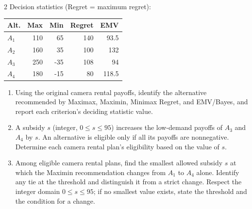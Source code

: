 \begin{multicols}{2}
\columnbreak
Decision statistics (Regret = maximum regret):

\vspace{-3mm}
\begin{center}\small\setlength{\tabcolsep}{4pt}
	\begin{tabular}{lrrrr}\toprule
		Alt. & Max & Min & Regret & EMV\\ \midrule
				$A_1$ & 110 & 65 & 140 & 93.5\\
		$A_2$ & 160 & 35 & 100 & 132\\
		$A_3$ & 250 & -35 & 108 & 94\\
		$A_4$ & 180 & -15 & 80 & 118.5\\
		\bottomrule
	\end{tabular}
\end{center}
\vspace{-3mm}

\begin{enumerate}[label=\textbf{(\alph*)},leftmargin=*]
	\item Using the original camera rental payoffs, identify the alternative recommended by Maximax, Maximin, Minimax Regret, and EMV/Bayes, and report each criterion's deciding statistic value. 

	\item A subsidy $s$ (integer, $0\leq s\leq95$) increases the low-demand payoffs of $A_3$ and $A_4$ by $s$. An alternative is eligible only if all its payoffs are nonnegative. Determine each camera rental plan's eligibility based on the value of $s$. 

	\item Among eligible camera rental plans, find the smallest allowed subsidy $s$ at which the Maximin recommendation changes from $A_1$ to $A_4$ alone. Identify any tie at the threshold and distinguish it from a strict change. Respect the integer domain $0\leq s\leq95$; if no smallest value exists, state the threshold and the condition for a change. 
\end{enumerate}


\end{multicols}
\newpage
